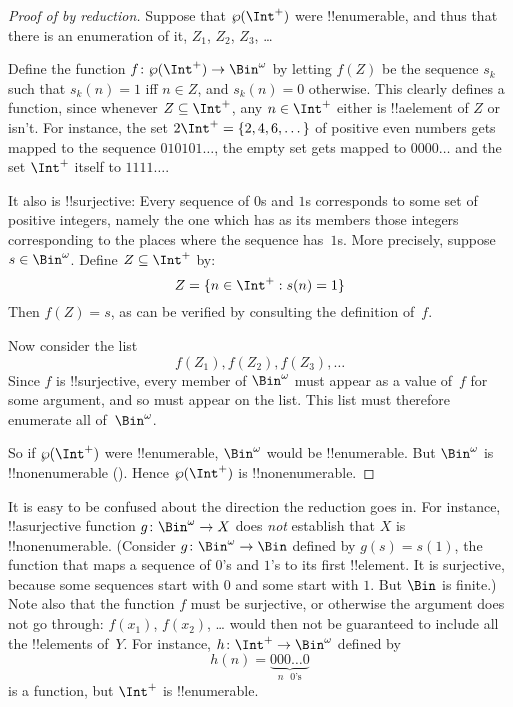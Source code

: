 \documentclass[../../../include/open-logic-section]{subfiles}
\begin{document}
\begin{proof}[Proof of {} by reduction]
Suppose that $\Pow{\Int^+}$ were !!{enumerable}, and thus that
there is an enumeration of it, $Z_{1}$, $Z_{2}$, $Z_{3}$, \dots

Define the function $f \colon \Pow{\Int^+} \to \Bin^\omega$ by letting
$f(Z)$ be the sequence $s_{k}$ such that $s_{k}(n) = 1$ iff $n \in Z$,
and $s_k(n) = 0$ otherwise.  This clearly defines a function, since
whenever $Z \subseteq \Int^+$, any $n \in \Int^+$ either is
!!a{element} of $Z$ or isn't.  For instance, the set $2\Int^+ = \{2,
4, 6, \dots\}$ of positive even numbers gets mapped to the sequence
$010101\dots$, the empty set gets mapped to $0000\dots$ and the set
$\Int^+$ itself to $1111\dots$.

It also is !!{surjective}: Every sequence of $0$s and $1$s corresponds
to some set of positive integers, namely the one which has as its
members those integers corresponding to the places where the sequence
has~$1$s. More precisely, suppose $s \in \Bin^\omega$.  Define $Z
\subseteq \Int^+$ by:
\[
Z = \Setabs{n \in \Int^+}{s(n) = 1}
\]
Then $f(Z) = s$, as can be verified by consulting the definition
of~$f$.

Now consider the list
\[
f(Z_1), f(Z_2), f(Z_3), \dots
\]
Since $f$ is !!{surjective}, every member of $\Bin^\omega$ must
appear as a value of~$f$ for some argument, and so must appear on the
list. This list must therefore enumerate all of~$\Bin^\omega$.

So if $\Pow{\Int^+}$ were !!{enumerable}, $\Bin^\omega$ would be
!!{enumerable}.  But $\Bin^\omega$ is !!{nonenumerable}
(). Hence $\Pow{\Int^+}$ is
!!{nonenumerable}.
\end{proof}

\begin{explain}
It is easy to be confused about the direction the reduction goes in.
For instance, !!a{surjective} function $g \colon \Bin^\omega \to X$
does \emph{not} establish that $X$ is !!{nonenumerable}.  (Consider $g
\colon \Bin^\omega \to \Bin$ defined by $g(s) = s(1)$, the function
that maps a sequence of $0$'s and $1$'s to its first !!{element}.  It
is surjective, because some sequences start with $0$ and some start
with $1$. But $\Bin$ is finite.)  Note also that the function $f$ must
be surjective, or otherwise the argument does not go through:
$f(x_1)$, $f(x_2)$, \dots{} would then not be guaranteed to include
all the !!{element}s of~$Y$. For instance, $h\colon \Int^+ \to
\Bin^\omega$ defined by
\[
h(n) = \underbrace{000\dots0}_{\text{$n$ $0$'s}}
\]
is a function, but $\Int^+$ is !!{enumerable}.
\end{explain}
\end{document}
